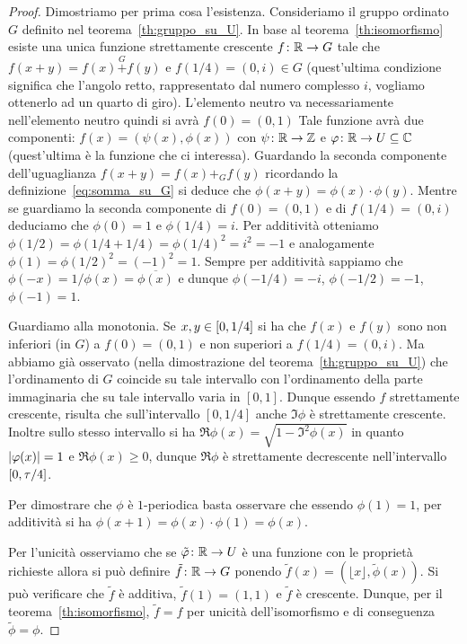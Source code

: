 \begin{proof}
  Dimostriamo per prima cosa l'esistenza.
  Consideriamo il gruppo ordinato $G$ definito nel 
  teorema~\ref{th:gruppo_su_U}.
  In base al teorema~\ref{th:isomorfismo} esiste una unica funzione 
  strettamente crescente $f\colon {\mathbb R} \to G$ tale che 
  $f(x+y) = f(x)\stackrel G+ f(y)$ e $f(1/4)=(0,i)\in G$
  (quest'ultima condizione significa che l'angolo retto, rappresentato dal 
  numero complesso $i$, vogliamo ottenerlo ad un quarto di giro). 
  L'elemento neutro va necessariamente nell'elemento neutro quindi
  si avrà $f(0)=(0,1)$
  Tale funzione avrà due componenti: $f(x) = (\psi(x),\phi(x))$
  con $\psi\colon {\mathbb R}\to{\mathbb Z}$ e $\varphi\colon {\mathbb R}\to U\subseteq {\mathbb C}$ 
  (quest'ultima è la funzione che ci interessa).
  Guardando la seconda componente dell'uguaglianza $f(x+y) = f(x)+_G f(y)$ 
  ricordando la definizione~\eqref{eq:somma_su_G}
  si deduce che $\phi(x+y) = \phi(x)\cdot \phi(y)$. 
  Mentre se guardiamo la seconda componente di $f(0)=(0,1)$ 
  e di $f(1/4) = (0,i)$ deduciamo che $\phi(0) = 1$ e $\phi(1/4) = i$.
  Per additività otteniamo 
  $\phi(1/2)=\phi(1/4+1/4)= \phi(1/4)^2 = i^2=-1$ 
  e analogamente $\phi(1) = \phi(1/2)^2 = (-1)^2 = 1$.
  Sempre per additività sappiamo che $\phi(-x) = 1/\phi(x)=\overline{\phi(x)}$ 
  e dunque $\phi(-1/4)=-i$, $\phi(-1/2)=-1$, $\phi(-1)=1$.
  
  Guardiamo alla monotonia. 
  Se $x,y\in \left[0,1/4\right]$ 
  si ha che $f(x)$ e $f(y)$ sono non inferiori (in $G$)
  a $f(0)=(0,1)$ e non superiori a $f(1/4)=(0,i)$.
  Ma abbiamo già osservato 
  (nella dimostrazione del teorema~\ref{th:gruppo_su_U})
  che l'ordinamento di $G$ coincide su tale intervallo 
  con l'ordinamento della parte immaginaria che su tale 
  intervallo varia in $[0,1]$.  
  Dunque essendo $f$ strettamente crescente, 
  risulta che sull'intervallo $[0,1/4]$ anche $\Im\phi$ è strettamente
  crescente. 
  Inoltre sullo stesso intervallo si ha 
  $\Re \phi(x) = \sqrt{1-\Im^2 \phi(x)}$ 
  in quanto ${\left|\varphi(x)\right|} = 1$ e $\Re \phi(x)\ge 0$,
  dunque $\Re \phi$ è strettamente decrescente 
  nell'intervallo $\left[0,\tau/4\right]$.

  Per dimostrare che $\phi$ è $1$-periodica 
  basta osservare che essendo $\phi(1)=1$, 
  per additività si ha $\phi(x+1) = \phi(x)\cdot \phi(1) = \phi(x)$.

  Per l'unicità osserviamo che se $\tilde{\varphi}\colon{\mathbb R}\to U$ è una funzione 
  con le proprietà richieste allora si può definire 
  $\tilde f\colon {\mathbb R} \to G$ ponendo $\tilde f(x) = (\lfloor x\rfloor, \tilde \phi(x))$.
  Si può verificare che $\tilde f$ è additiva, $\tilde f(1)=(1, 1)$ 
  e $\tilde f$ è crescente. 
  Dunque, per il teorema~\ref{th:isomorfismo}, $\tilde f = f$ 
  per unicità dell'isomorfismo e di conseguenza $\tilde \phi = \phi$.
\end{proof}


